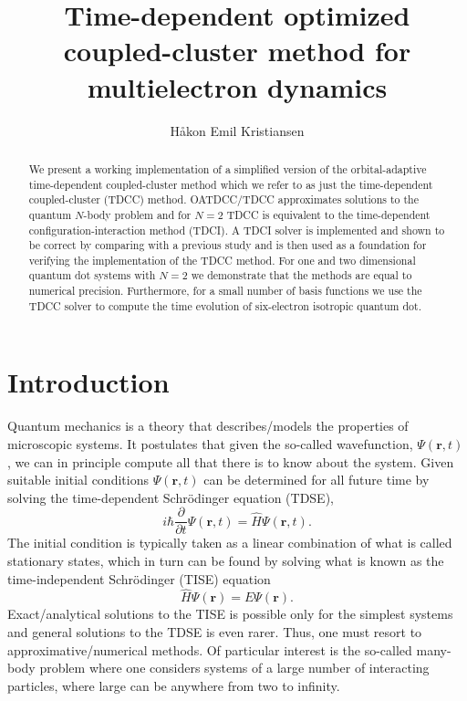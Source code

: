\documentclass[aip,jcp,reprint,floatfix]{revtex4-1}
\begin{document}
\title{Time-dependent optimized coupled-cluster method for multielectron dynamics}

\author{Håkon Emil Kristiansen}


\begin{abstract}
We present a working implementation of a simplified version of the
orbital-adaptive time-dependent coupled-cluster method which we refer
to as just the time-dependent coupled-cluster (TDCC) method.
OATDCC/TDCC approximates solutions to the quantum $N$-body problem and
for $N=2$ TDCC is equivalent to the time-dependent
configuration-interaction method (TDCI).  A TDCI solver is implemented
and shown to be correct by comparing with a previous study and is then
used as a foundation for verifying the implementation of the TDCC
method. For one and two dimensional quantum dot systems with $N=2$ we
demonstrate that the methods are equal to numerical
precision. Furthermore, for a small number of basis functions we use
the TDCC solver to compute the time evolution of six-electron
isotropic quantum dot.
\end{abstract}


\maketitle




\section{Introduction}

Quantum mechanics is a theory that describes/models the properties of
microscopic systems. It postulates that given the so-called
wavefunction, $\Psi(\mathbf{r},t)$, we can in principle compute all
that there is to know about the system.  Given suitable initial
conditions $\Psi(\mathbf{r},t)$ can be determined for all future time
by solving the time-dependent Schrödinger equation (TDSE),
\begin{equation}
 i \hbar \frac{\partial }{\partial t} \Psi(\mathbf{r},t) = \hat{H} \Psi(\mathbf{r},t).
\end{equation}
The initial condition is typically taken as a linear combination of what is called stationary states, which in turn can be found by solving what is known as the 
time-independent Schrödinger (TISE) equation
\begin{equation}
 \hat{H} \Psi(\mathbf{r}) = E \Psi(\mathbf{r}).
\end{equation}
Exact/analytical solutions to the TISE is possible only for the
simplest systems and general solutions to the TDSE is even
rarer. Thus, one must resort to approximative/numerical methods. Of
particular interest is the so-called many-body problem where one
considers systems of a large number of interacting particles, where
large can be anywhere from two to infinity.
\end{document}
